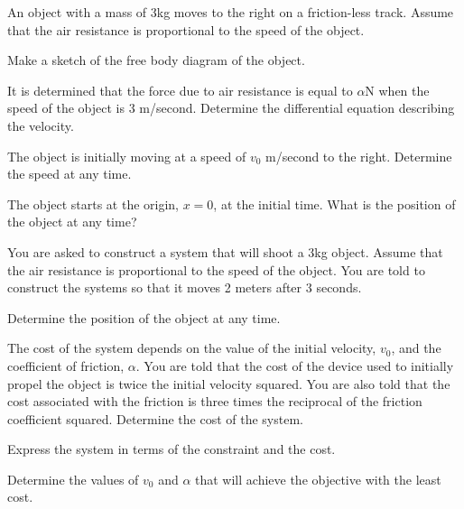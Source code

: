 \begin{problem}
\item An object with a mass of 3kg moves to the right on a
  friction-less track. Assume that the air resistance is proportional
  to the speed of the object.
  \begin{subproblem}
  \item Make a sketch of the free body diagram of the object.
    \vfill
  \item It is determined that the force due to air resistance is equal
    to $\alpha$N when the speed of the object is 3
    m/second. Determine the differential equation describing the velocity.
    \vfill
  \item The object is initially moving at a speed of $v_0$ m/second to
    the right. Determine the speed at any time.  
    \vfill
  \item The object starts at the origin, $x=0$, at the initial
    time. What is the position of the object at any time?
    \vfill
  \end{subproblem}
  \clearpage
\item You are asked to construct a system that will shoot a 3kg
  object. Assume that the air resistance is proportional to the speed
  of the object. You are told to construct the systems so that it
  moves 2 meters after 3 seconds.
  \begin{subproblem}
  \item Determine the position of the object at any time.
    \vfill
  \item The cost of the system depends on the value of the initial
    velocity, $v_0$, and the coefficient of friction, $\alpha$. You
    are told that the cost of the device used to initially propel the
    object is twice the initial velocity squared. You are also told
    that the cost associated with the friction is three times the
    reciprocal of the friction coefficient squared. Determine the cost
    of the system.
    \vfill
  \item Express the system in terms of the constraint and the cost.
    \vfill
    \clearpage
  \item Determine the values of $v_0$ and $\alpha$ that will achieve
    the objective with the least cost.
    \vfill
  \end{subproblem}
\end{problem}

